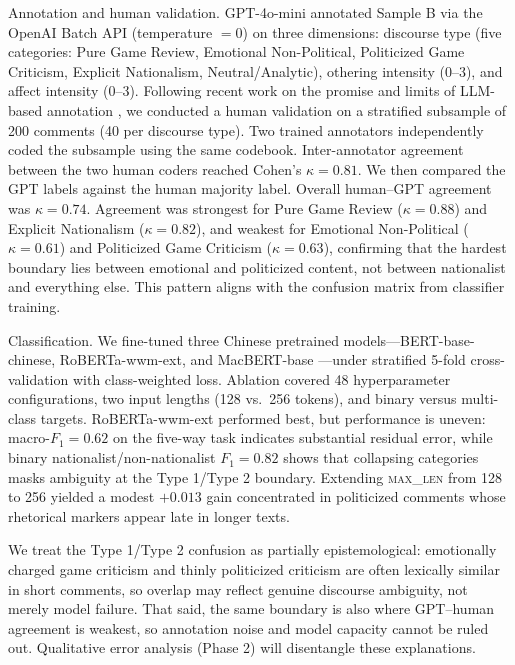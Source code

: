 \documentclass[man, 12pt, mask, floatsintext, nolmodern]{apa7}
\begin{document}
Annotation and human validation. GPT-4o-mini annotated Sample B via the OpenAI Batch API (temperature $= 0$) on three dimensions: discourse type (five categories: Pure Game Review, Emotional Non-Political, Politicized Game Criticism, Explicit Nationalism, Neutral/Analytic), othering intensity (0--3), and affect intensity (0--3). Following recent work on the promise and limits of LLM-based annotation \parencite{gilardi2023, tan2024llm}, we conducted a human validation on a stratified subsample of 200 comments (40 per discourse type). Two trained annotators independently coded the subsample using the same codebook. Inter-annotator agreement between the two human coders reached Cohen's $\kappa = 0.81$. We then compared the GPT labels against the human majority label. Overall human--GPT agreement was $\kappa = 0.74$. Agreement was strongest for Pure Game Review ($\kappa = 0.88$) and Explicit Nationalism ($\kappa = 0.82$), and weakest for Emotional Non-Political ($\kappa = 0.61$) and Politicized Game Criticism ($\kappa = 0.63$), confirming that the hardest boundary lies between emotional and politicized content, not between nationalist and everything else. This pattern aligns with the confusion matrix from classifier training.

Classification. We fine-tuned three Chinese pretrained models---BERT-base-chinese, RoBERTa-wwm-ext, and MacBERT-base \parencite{cui2020macbert}---under stratified 5-fold cross-validation with class-weighted loss. Ablation covered 48 hyperparameter configurations, two input lengths (128 vs.\ 256 tokens), and binary versus multi-class targets. RoBERTa-wwm-ext performed best, but performance is uneven: macro-$F_1 = 0.62$ on the five-way task indicates substantial residual error, while binary nationalist/non-nationalist $F_1 = 0.82$ shows that collapsing categories masks ambiguity at the Type 1/Type 2 boundary. Extending \textsc{max\_len} from 128 to 256 yielded a modest $+0.013$ gain concentrated in politicized comments whose rhetorical markers appear late in longer texts.

We treat the Type 1/Type 2 confusion as partially epistemological: emotionally charged game criticism and thinly politicized criticism are often lexically similar in short comments, so overlap may reflect genuine discourse ambiguity, not merely model failure. That said, the same boundary is also where GPT--human agreement is weakest, so annotation noise and model capacity cannot be ruled out. Qualitative error analysis (Phase 2) will disentangle these explanations.
\end{document}

